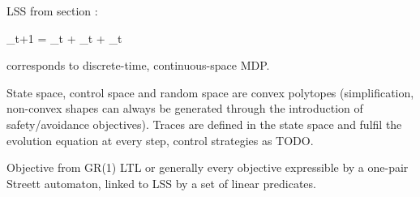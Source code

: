 LSS from section :

\startformula
    \VecX_{t+1} = \MatA \VecX_t + \MatB \VecU_t + \VecW_t \EndComma
\stopformula

corresponds to discrete-time, continuous-space MDP.

State space, control space and random space are convex polytopes (simplification, non-convex shapes can always be generated through the introduction of safety/avoidance objectives).
Traces are defined in the state space and fulfil the evolution equation at every step, control strategies as TODO.

Objective from GR(1) LTL or generally every objective expressible by a one-pair Streett automaton, linked to LSS by a set of linear predicates.

